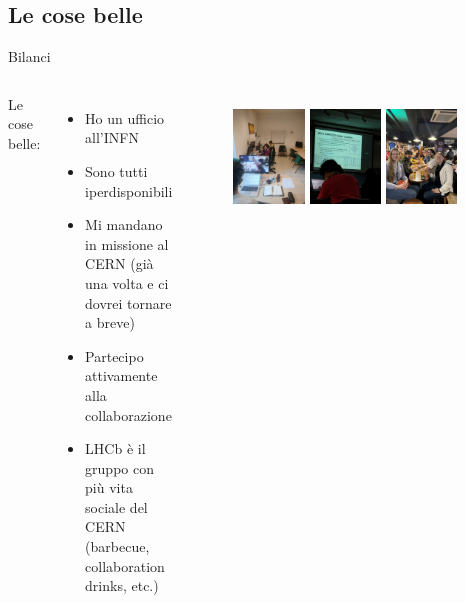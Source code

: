 \documentclass[
10pt,
aspectratio=169,
]{beamer}
\begin{document}
\subsection{Le cose belle}
\begin{frame}{Bilanci}
\begin{columns}
    Le cose belle:
\begin{itemize}
    \item Ho un ufficio all'INFN
    \item Sono tutti iperdisponibili
    \item Mi mandano in missione al CERN (già una volta e ci dovrei tornare a breve)
    \item Partecipo attivamente alla collaborazione
    \item LHCb è il gruppo con più vita sociale del CERN (barbecue, collaboration drinks, etc.)
    \end{itemize}
    \begin{figure}
        \centering
        \includegraphics[width=0.3\textwidth]{office.jpeg}
                \includegraphics[width=0.3\textwidth]{mio_plot.jpeg}
        \includegraphics[width=0.3\textwidth]{birra.jpeg}


\end{figure}
\end{columns}
\end{frame}
\end{document}
